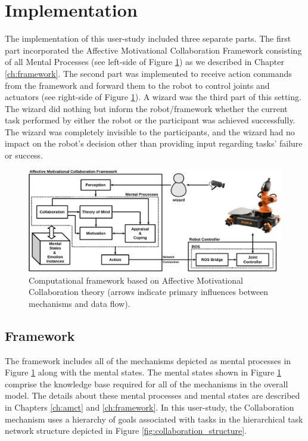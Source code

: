 \documentclass[12pt]{report}
\begin{document}
\section{Implementation}
The implementation of this user-study included three separate parts. The first
part incorporated the Affective Motivational Collaboration Framework consisting
of all Mental Processes (see left-side of Figure \ref{fig:framework}) as we
described in Chapter \ref{ch:framework}. The second part was implemented to
receive action commands from the framework and forward them to the robot to
control joints and actuators (see right-side of Figure \ref{fig:framework}).
A wizard was the third part of this setting. The wizard did nothing but inform
the robot/framework whether the current task performed by either the robot or
the participant was achieved successfully. The wizard was completely invisible
to the participants, and the wizard had no impact on the robot's decision other
than providing input regarding tasks' failure or success.

\begin{figure}[tbh]
  \centering
  \includegraphics[width=\textwidth]{figure/framework-croped.pdf}
  \caption{\fontsize{10}{10}\selectfont Computational framework based on
  Affective Motivational Collaboration theory (arrows indicate primary
  influences between mechanisms and data flow).}
  \label{fig:framework}
\end{figure}

\subsection{Framework}
\label{sec:theory}
The framework includes all of the mechanisms depicted as mental processes in
Figure \ref{fig:framework} along with the mental states. The mental
states shown in Figure \ref{fig:framework} comprise the knowledge base required
for all of the mechanisms in the overall model. The details about these mental
processes and mental states are described in Chapters \ref{ch:amct} and
\ref{ch:framework}. In this user-study, the Collaboration mechanism uses a
hierarchy of goals associated with tasks in the hierarchical task network
structure depicted in Figure \ref{fig:collaboration_structure}.
\end{document}
